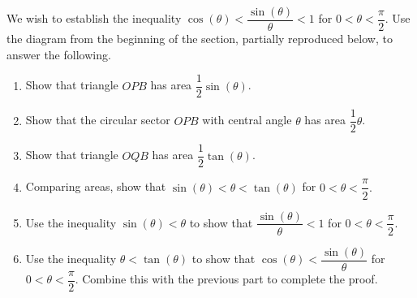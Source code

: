 {We wish to establish the inequality $\cos(\theta) < \dfrac{\sin(\theta)}{\theta} < 1$ for $0 < \theta < \dfrac{\pi}{2}.$  Use the diagram from the beginning of the section, partially reproduced below, to answer the following.

\begin{center}
\end{center}

\begin{enumerate}

\item Show that triangle $OPB$ has area $\dfrac{1}{2} \sin(\theta)$.
\item Show that the circular sector $OPB$ with central angle $\theta$ has area $\dfrac{1}{2} \theta$.
\item Show that triangle $OQB$ has area $\dfrac{1}{2} \tan(\theta)$.
\item Comparing areas, show that $\sin(\theta) < \theta < \tan(\theta)$ for $0 < \theta < \dfrac{\pi}{2}.$ 
\item Use the inequality $\sin(\theta) < \theta$ to show that $\dfrac{\sin(\theta)}{\theta} < 1$ for $0 < \theta < \dfrac{\pi}{2}.$
\item Use the inequality $\theta < \tan(\theta)$ to show that $\cos(\theta) < \dfrac{\sin(\theta)}{\theta}$ for $0 < \theta < \dfrac{\pi}{2}.$  Combine this with the previous part to complete the proof.

\end{enumerate}}
{}